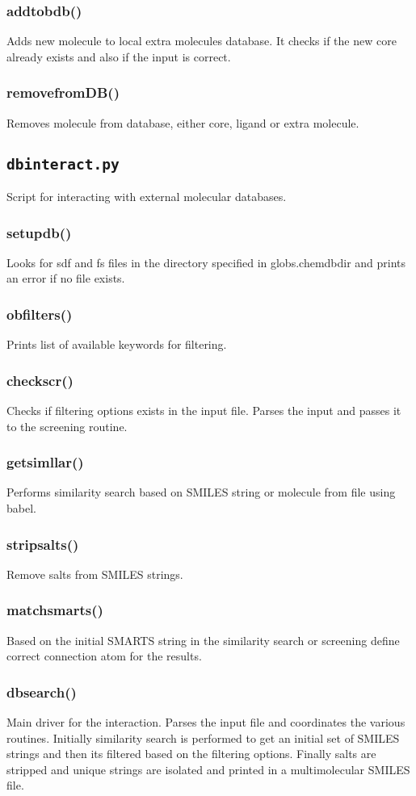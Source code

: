 \documentclass[a4paper,12pt]{assignment}
\begin{document}
\subsubsection{addtobdb()}
Adds new molecule to local extra molecules database. It checks if the new core already exists and also if the input is correct.
\subsubsection{removefromDB()}
Removes molecule from database, either core, ligand or extra molecule.

\subsection{\texttt{dbinteract.py}}
Script for interacting with external molecular databases. 
\subsubsection{setupdb()}
Looks for sdf and fs files in the directory specified in globs.chemdbdir and prints an error if no file exists.
\subsubsection{obfilters()}
Prints list of available keywords for filtering.
\subsubsection{checkscr()}
Checks if filtering options exists in the input file. Parses the input and passes it to the screening routine.
\subsubsection{getsimllar()}
Performs similarity search based on SMILES string or molecule from file using babel.
\subsubsection{stripsalts()}
Remove salts from SMILES strings.
\subsubsection{matchsmarts()}
Based on the initial SMARTS string in the similarity search or screening define correct connection atom for the results.
\subsubsection{dbsearch()} 
Main driver for the interaction. Parses the input file and coordinates the various routines. Initially similarity search is performed to get an initial set of SMILES strings and then its filtered based on the filtering options. Finally salts are stripped and unique strings are isolated and printed in a multimolecular SMILES file.
\end{document}
